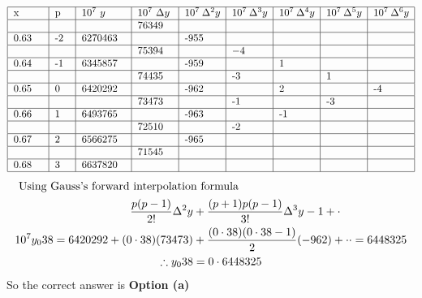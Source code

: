 \begin{enumerate}
\begin{answer}
\begin{align*}
\begin{tabular}{|p{1cm}| p{.5cm}|p{1.5cm}|p{1.2cm} |p{1.2cm}|p{1.2cm}|p{1.2cm}|p{1.2cm}|p{1.2cm}|}
\hline
x&p&$10^7\ y$&$10^7\ \Delta y$&$10^7\ \Delta^2 y$&$10^7\ \Delta^3 y$&$10^7\ \Delta^4 y$&$10^7\ \Delta^5 y$&$10^7\ \Delta^6 y$\\
\hline
& & &76349& & & & &\\
\hline 
0.63&-2&6270463& &-955& & & &\\
\hline
& & &75394& &$-4$& & &  \\
\hline
0.64&-1&6345857& &-959& &1& & \\
\hline
& & &74435& &-3& &1& \\
\hline
0.65&0&6420292& &-962& &2& &-4 \\
\hline
 & & &73473& &-1& &-3&  \\
 \hline
 0.66&1&6493765& &-963& &-1& &  \\
 \hline
  & & &72510& &-2& & & \\
  \hline
  0.67&2&6566275& &-965& & & &  \\
  \hline
   & & &71545& & & & & \\
   \hline
    0.68&3&6637820& & & & & &  \\
    \hline
\end{tabular}
\end{align*}	
		\begin{align*}
	\intertext{	Using Gauss's forward interpolation formula}
		\frac{p(p-1)}{2 !} \Delta^{2} y&+\frac{(p+1) p(p-1)}{3 !} \Delta^{3} y-1+\cdot \\
		10^{7} y_{0} 38=6420292+(0 \cdot 38)(73473)&+\frac{(0 \cdot 38)(0 \cdot 38-1)}{2}(-962)+\cdot \cdot=6448325 \\
		\therefore y_{0} 38&=0 \cdot 6448325
		\end{align*}
			So the correct answer is \textbf{Option (a)}
	\end{answer}
\end{enumerate}
